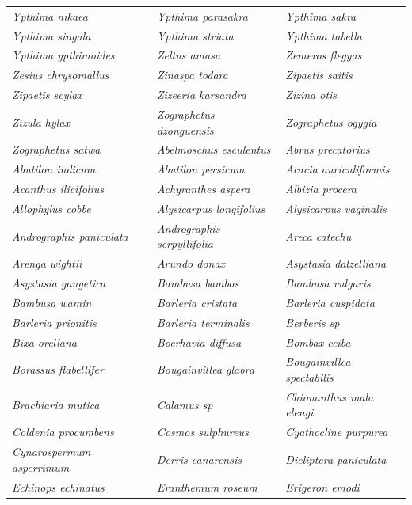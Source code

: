 \documentclass[runningheads]{llncs}
\begin{document}
\begin{longtable}{lll}
\textit{Ypthima nikaea} & \textit{Ypthima parasakra} & \textit{Ypthima sakra} \\
\textit{Ypthima singala} & \textit{Ypthima striata} & \textit{Ypthima tabella} \\
\textit{Ypthima ypthimoides} & \textit{Zeltus amasa} & \textit{Zemeros flegyas} \\
\textit{Zesius chrysomallus} & \textit{Zinaspa todara} & \textit{Zipaetis saitis} \\
\textit{Zipaetis scylax} & \textit{Zizeeria karsandra} & \textit{Zizina otis} \\
\textit{Zizula hylax} & \textit{Zographetus dzonguensis} & \textit{Zographetus ogygia} \\
\textit{Zographetus satwa} & \textit{Abelmoschus esculentus} & \textit{Abrus precatorius} \\
\textit{Abutilon indicum} & \textit{Abutilon persicum} & \textit{Acacia auriculiformis} \\
\textit{Acanthus ilicifolius} & \textit{Achyranthes aspera} & \textit{Albizia procera} \\
\textit{Allophylus cobbe} & \textit{Alysicarpus longifolius} & \textit{Alysicarpus vaginalis} \\
\textit{Andrographis paniculata} & \textit{Andrographis serpyllifolia} & \textit{Areca catechu} \\
\textit{Arenga wightii} & \textit{Arundo donax} & \textit{Asystasia dalzelliana} \\
\textit{Asystasia gangetica} & \textit{Bambusa bambos} & \textit{Bambusa vulgaris} \\
\textit{Bambusa wamin} & \textit{Barleria cristata} & \textit{Barleria cuspidata} \\
\textit{Barleria prionitis} & \textit{Barleria terminalis} & \textit{Berberis sp} \\
\textit{Bixa orellana} & \textit{Boerhavia diffusa} & \textit{Bombax ceiba} \\
\textit{Borassus flabellifer} & \textit{Bougainvillea glabra} & \textit{Bougainvillea spectabilis} \\
\textit{Brachiaria mutica} & \textit{Calamus sp} & \textit{Chionanthus mala elengi} \\
\textit{Coldenia procumbens} & \textit{Cosmos sulphureus} & \textit{Cyathocline purpurea} \\
\textit{Cynarospermum asperrimum} & \textit{Derris canarensis} & \textit{Dicliptera paniculata} \\
\textit{Echinops echinatus} & \textit{Eranthemum roseum} & \textit{Erigeron emodi} \\

\end{longtable}
\end{document}
